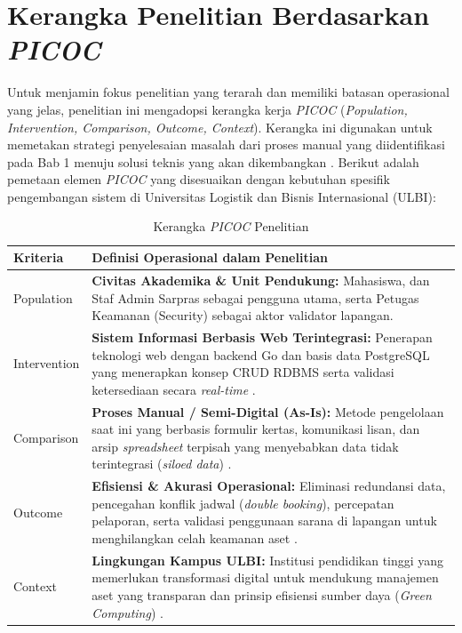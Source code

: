 \section{Kerangka Penelitian Berdasarkan \textit{PICOC}}
Untuk menjamin fokus penelitian yang terarah dan memiliki batasan operasional yang jelas, penelitian ini mengadopsi kerangka kerja \textit{PICOC} (\textit{Population, Intervention, Comparison, Outcome, Context}). Kerangka ini digunakan untuk memetakan strategi penyelesaian masalah dari proses manual yang diidentifikasi pada Bab 1 menuju solusi teknis yang akan dikembangkan \parencite{Putrianasari2024}. Berikut adalah pemetaan elemen \textit{PICOC} yang disesuaikan dengan kebutuhan spesifik pengembangan sistem di Universitas Logistik dan Bisnis Internasional (ULBI):

\begin{table}[htbp]
    \centering
    \caption{Kerangka \textit{PICOC} Penelitian}
    \label{tab:picoc_penelitian}
    \begin{tabular}{|p{3cm}|p{12cm}|}
        \hline
        \textbf{Kriteria} & \textbf{Definisi Operasional dalam Penelitian} \\
        \hline
        Population & \textbf{Civitas Akademika \& Unit Pendukung:} Mahasiswa, dan Staf Admin Sarpras sebagai pengguna utama, serta Petugas Keamanan (Security) sebagai aktor validator lapangan. \\
        \hline
        Intervention & \textbf{Sistem Informasi Berbasis Web Terintegrasi:} Penerapan teknologi web dengan backend Go dan basis data PostgreSQL yang menerapkan konsep CRUD RDBMS serta validasi ketersediaan secara \textit{real-time} \parencite{Pratama2025, Velasquez-Jimenez2025}. \\
        \hline
        Comparison & \textbf{Proses Manual / Semi-Digital (As-Is):} Metode pengelolaan saat ini yang berbasis formulir kertas, komunikasi lisan, dan arsip \textit{spreadsheet} terpisah yang menyebabkan data tidak terintegrasi (\textit{siloed data}) \parencite{PutriNabella2025, Purwati2022}. \\
        \hline
        Outcome & \textbf{Efisiensi \& Akurasi Operasional:} Eliminasi redundansi data, pencegahan konflik jadwal (\textit{double booking}), percepatan pelaporan, serta validasi penggunaan sarana di lapangan untuk menghilangkan celah keamanan aset \parencite{Ramdany2024}. \\
        \hline
        Context & \textbf{Lingkungan Kampus ULBI:} Institusi pendidikan tinggi yang memerlukan transformasi digital untuk mendukung manajemen aset yang transparan dan prinsip efisiensi sumber daya (\textit{Green Computing}) \parencite{Herlambang2020, Kim2021}. \\
        \hline
    \end{tabular}
\end{table}

